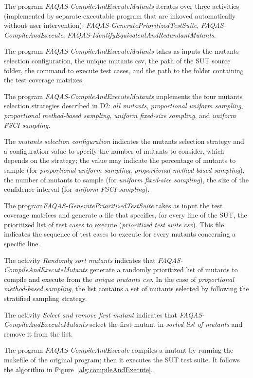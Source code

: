 \RQ{} The program \emph{FAQAS-CompileAndExecuteMutants} iterates over three activities (implemented by separate executable program that are inkoved automatically without user intervention): \emph{FAQAS-GeneratePrioritizedTestSuite}, \emph{FAQAS-CompileAndExecute}, \emph{FAQAS-IdentifyEquivalentAndRedundantMutants}.

\RQ{} The program \emph{FAQAS-CompileAndExecuteMutants} takes as inputs the mutants selection configuration, the unique mutants csv, the path of the SUT source folder, the command to execute test cases, and the path to the folder containing the test coverage matrixes.

\RQ{} The program \emph{FAQAS-CompileAndExecuteMutants} implements the four mutants selection strategies described in D2: \emph{all mutants}, \emph{proportional uniform sampling}, \emph{proportional method-based sampling}, \emph{uniform fixed-size sampling}, and \emph{uniform FSCI sampling}.

\RQ{} The \emph{mutants selection configuration} indicates the mutants selection strategy and a configuration value to specify the number of mutants to consider, which depends on the strategy; the value may indicate the percentage of mutants to sample (for \emph{proportional uniform sampling}, \emph{proportional method-based sampling}), the number of mutants to sample (for \emph{uniform fixed-size sampling}), the size of the confidence interval (for \emph{uniform FSCI sampling}).

\RQ{} The program\emph{FAQAS-GeneratePrioritizedTestSuite} takes as input the test coverage matrices and generate a file that specifies, for every line of the SUT, the prioritized list of test cases to execute (\emph{prioritized test suite csv}). This file indicates the sequence of test cases to execute for every mutants concerning a specific line.

\RQ{} The activity \emph{Randomly sort mutants} indicates that  \emph{FAQAS-CompileAndExecuteMutants} generate a randomly prioritized list of mutants to compile and execute from the \emph{unique mutants csv}.
In the case of \emph{proportional method-based sampling}, the list contains a set of mutants selected by following the stratified sampling strategy.

\RQ{} The activity \emph{Select and remove first mutant} indicates that  \emph{FAQAS-CompileAndExecuteMutants} select the first mutant in \emph{sorted list of mutants} and remove it from the list.

\RQ{} The program \emph{FAQAS-CompileAndExecute} compiles a mutant by running the makefile of the original program; then it executes the SUT test suite. It follows the algorithm in Figure~\ref{alg:compileAndExecute}.


